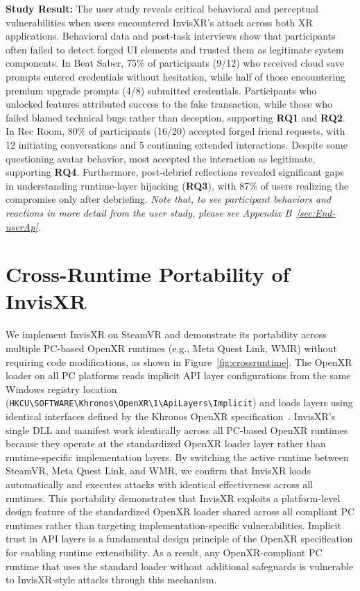 \documentclass[letterpaper,twocolumn,10pt]{article}
\begin{document}
\textbf{Study Result:}
\label{sec:userstudyresult}
The user study reveals critical behavioral and perceptual vulnerabilities when users encountered InvisXR's attack across both XR applications. Behavioral data and post-task interviews show that participants often failed to detect forged UI elements and trusted them as legitimate system components. In Beat Saber, 75\% of participants (9/12) who received cloud save prompts entered credentials without hesitation, while half of those encountering premium upgrade prompts (4/8) submitted credentials. Participants who unlocked features attributed success to the fake transaction, while those who failed blamed technical bugs rather than deception, supporting \textbf{RQ1} and \textbf{RQ2}. In Rec Room, 80\% of participants (16/20) accepted forged friend requests, with 12 initiating conversations and 5 continuing extended interactions. Despite some questioning avatar behavior, most accepted the interaction as legitimate, supporting \textbf{RQ4}. Furthermore, post-debrief reflections revealed significant gaps in understanding runtime-layer hijacking (\textbf{RQ3}), with 87\% of users realizing the compromise only after debriefing. \textit{Note that, to see participant behaviors and reactions in more detail from the user study, please see Appendix B~\ref{sec:End-userAp}.}

\section{Cross-Runtime Portability of InvisXR}
\label{sec:generalizabilityofinvisXR} We implement InvisXR on SteamVR and demonstrate its portability across multiple PC-based OpenXR runtimes (e.g., Meta Quest Link, WMR) without requiring code modifications, as shown in Figure~\ref{fig:crossruntime}. The OpenXR loader on all PC platforms reads implicit API layer configurations from the same Windows registry location (\texttt{HKCU\allowbreak\textbackslash SOFTWARE\allowbreak\textbackslash Khronos\allowbreak\textbackslash OpenXR\allowbreak\textbackslash 1\allowbreak\textbackslash ApiLayers\allowbreak\textbackslash Implicit}) and loads layers using identical interfaces defined by the Khronos OpenXR specification~\cite{khronosOpenXR}. InvisXR's single DLL and manifest work identically across all PC-based OpenXR runtimes because they operate at the standardized OpenXR loader layer rather than runtime-specific implementation layers. By switching the active runtime between SteamVR, Meta Quest Link, and WMR, we confirm that InvisXR loads automatically and executes attacks with identical effectiveness across all runtimes. This portability demonstrates that InvisXR exploits a platform-level design feature of the standardized OpenXR loader shared across all compliant PC runtimes rather than targeting implementation-specific vulnerabilities. Implicit trust in API layers is a fundamental design principle of the OpenXR specification for enabling runtime extensibility. As a result, any OpenXR-compliant PC runtime that uses the standard loader without additional safeguards is vulnerable to InvisXR-style attacks through this mechanism.
\end{document}
